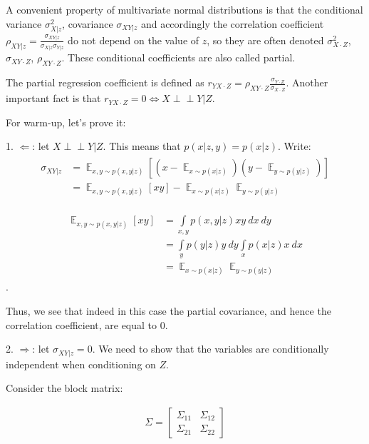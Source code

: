 \documentclass[fleqn]{article}
\DeclareMathOperator{\E}{\mathop\mathbb{E}}
\newcommand{\independent}{\perp \!\!\! \perp}
\numberwithin{equation}{section}
\numberwithin{theorem}{section}
\numberwithin{figure}{section}
\numberwithin{lemma}{section}
\numberwithin{corollary}{section}
\begin{document}
A convenient property of multivariate normal distributions is that the conditional variance $\sigma^2_{X|z}$, covariance $\sigma_{XY|z}$ and accordingly the correlation coefficient $\rho_{XY|z} = \frac{\sigma_{XY|z}}{\sigma_{X|z}\sigma_{Y|z}}$ do not depend on the value of $z$, so they are often denoted $\sigma^2_{X\cdot Z}$, $\sigma_{XY\cdot Z}$, $\rho_{XY\cdot Z}$. These conditional coefficients are also called partial.

The partial regression coefficient is defined as $r_{YX\cdot Z} = \rho_{XY\cdot Z} \frac{\sigma_{Y\cdot Z}}{\sigma_{X\cdot Z}}$. Another important fact is that $r_{YX\cdot Z} = 0 \Leftrightarrow X \independent Y | Z$.

For warm-up, let's prove it:

1. $\Leftarrow$: let $X \independent Y | Z$. This means that $p(x|z,y) = p(x|z)$.
Write:
\begin{align}
	\begin{split}
		\sigma_{XY|z} &= \E_{x,y\sim p(x,y|z)}[(x - \E_{x\sim p(x|z)})(y - \E_{y\sim p(y|z)})] \\&= \E_{x,y\sim p(x,y|z)}[xy] - \E_{x\sim p(x|z)}\E_{y\sim p(y|z)}
	\end{split}
\end{align}

\begin{align}
	\begin{split}
		\E_{x,y\sim p(x,y|z)}[xy]&= \int\limits_{x,y}p(x,y|z)xy\ dx\ dy \\&=  \int\limits_{y}p(y|z)y\ dy \int\limits_{x}p(x|z)x\ dx \\
		&=  \E_{x\sim p(x|z)}\E_{y\sim p(y|z)}
	\end{split}
\end{align}.

Thus, we see that indeed in this case the partial covariance, and hence the correlation coefficient, are equal to 0.

2. $\Rightarrow$: let $\sigma_{XY|z} = 0$. We need to show that the variables are conditionally independent when conditioning on $Z$.

Consider the block matrix:

\begin{align}
	\Sigma = \begin{bmatrix}
		\Sigma_{11}       & \Sigma_{12} \\
		\Sigma_{21}       & \Sigma_{22}
	\end{bmatrix}
\end{align}
\end{document}
